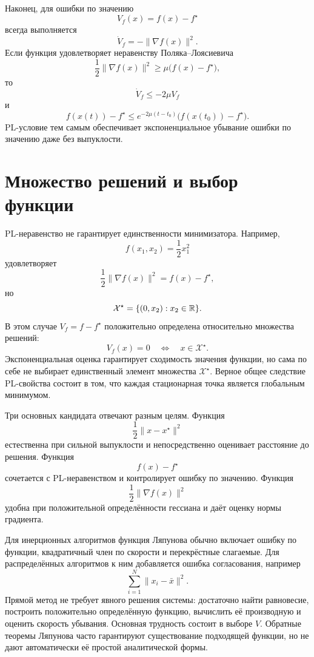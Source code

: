 Наконец, для ошибки по значению
\[
    V_f(x)=f(x)-f^\star
\]
всегда выполняется
\[
    \dot V_f
    =
    -\lVert\nabla f(x)\rVert^2.
\]
Если функция удовлетворяет неравенству Поляка--Лоясиевича
\[
    \frac12\lVert\nabla f(x)\rVert^2
    \ge
    \mu\bigl(f(x)-f^\star\bigr),
\]
то
\[
    \dot V_f\le-2\mu V_f
\]
и
\[
    f(x(t))-f^\star
    \le
    e^{-2\mu(t-t_0)}
    \bigl(f(x(t_0))-f^\star\bigr).
\]
PL-условие тем самым обеспечивает экспоненциальное убывание ошибки
по значению даже без выпуклости.

\section{Множество решений и выбор функции}

PL-неравенство не гарантирует единственности минимизатора. Например,
\[
    f(x_1,x_2)=\frac12x_1^2
\]
удовлетворяет
\[
    \frac12\lVert\nabla f(x)\rVert^2
    =
    f(x)-f^\star,
\]
но
\[
    \mathcal X^\star
    =
    \{(0,x_2):x_2\in\mathbb{R}\}.
\]
В этом случае \(V_f=f-f^\star\) положительно определена относительно
множества решений:
\[
    V_f(x)=0
    \quad\Longleftrightarrow\quad
    x\in\mathcal X^\star.
\]
Экспоненциальная оценка гарантирует сходимость значения функции, но
сама по себе не выбирает единственный элемент множества
\(\mathcal X^\star\). Верное общее следствие PL-свойства состоит в том,
что каждая стационарная точка является глобальным минимумом.

Три основных кандидата отвечают разным целям. Функция
\[
    \frac12\lVert x-x^\star\rVert^2
\]
естественна при сильной выпуклости и непосредственно оценивает
расстояние до решения. Функция
\[
    f(x)-f^\star
\]
сочетается с PL-неравенством и контролирует ошибку по значению.
Функция
\[
    \frac12\lVert\nabla f(x)\rVert^2
\]
удобна при положительной определённости гессиана и даёт оценку нормы
градиента.

Для инерционных алгоритмов функция Ляпунова обычно включает ошибку по
функции, квадратичный член по скорости и перекрёстные слагаемые. Для
распределённых алгоритмов к ним добавляется ошибка согласования,
например
\[
    \sum_{i=1}^{N}\lVert x_i-\bar x\rVert^2.
\]
Прямой метод не требует явного решения системы: достаточно найти
равновесие, построить положительно определённую функцию, вычислить её
производную и оценить скорость убывания. Основная трудность состоит
в выборе \(V\). Обратные теоремы Ляпунова часто гарантируют
существование подходящей функции, но не дают автоматически её простой
аналитической формы.
